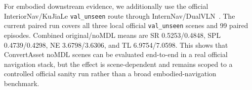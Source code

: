 For embodied downstream evidence, we additionally use the official
InteriorNav/KuJiaLe \texttt{val\_unseen} route through
InternNav/DualVLN~\cite{Wei2026Ground}. The
current paired run covers all three local official \texttt{val\_unseen} scenes
and 99 paired episodes. Combined original/noMDL means are SR 0.5253/0.4848,
SPL 0.4739/0.4298, NE 3.6798/3.6306, and TL 6.9754/7.0598. This shows that
ConvertAsset noMDL scenes can be evaluated end-to-end in a real official
navigation stack, but the effect is scene-dependent and remains scoped to a
controlled official sanity run rather than a broad embodied-navigation
benchmark.
